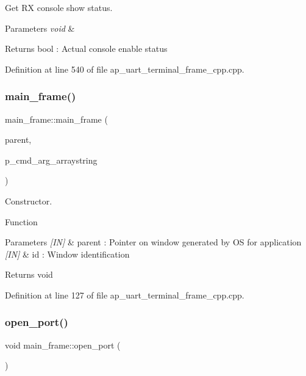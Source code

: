 Get RX console show status. 


\begin{DoxyParams}{Parameters}
{\em void} & \\
\hline
\end{DoxyParams}
\begin{DoxyReturn}{Returns}
bool \+: Actual console enable status 
\end{DoxyReturn}


Definition at line 540 of file ap\+\_\+uart\+\_\+terminal\+\_\+frame\+\_\+cpp.\+cpp.

\mbox{\label{group___u_a_r_t__terminal_gae30d00adda4c03c32326ea6e9b5fae35}} 
\subsubsection{main\_frame()}
{\footnotesize\ttfamily main\+\_\+frame\+::main\+\_\+frame (\begin{DoxyParamCaption}\item[{wx\+Window $\ast$}]{parent,  }\item[{wx\+Array\+String $\ast$}]{p\+\_\+cmd\+\_\+arg\+\_\+arraystring }\end{DoxyParamCaption})}



Constructor. 

Function
\begin{DoxyParams}{Parameters}
{\em \mbox{[}\+I\+N\mbox{]}} & parent \+: Pointer on window generated by OS for application \\
\hline
{\em \mbox{[}\+I\+N\mbox{]}} & id \+: Window identification \\
\hline
\end{DoxyParams}
\begin{DoxyReturn}{Returns}
void 
\end{DoxyReturn}


Definition at line 127 of file ap\+\_\+uart\+\_\+terminal\+\_\+frame\+\_\+cpp.\+cpp.

\mbox{\label{group___u_a_r_t__terminal_gad3d8849cc0df34ac89516e637e827c32}} 
\subsubsection{open\_port()}
{\footnotesize\ttfamily void main\+\_\+frame\+::open\+\_\+port (\begin{DoxyParamCaption}\item[{void}]{ }\end{DoxyParamCaption})}



